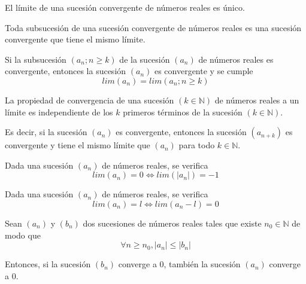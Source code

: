 \begin{propo}\label{prop_20200529A}
	El límite de una sucesión convergente de números reales es único. \cite[p55]{prieto2008}
\end{propo}

\begin{propo}\label{prop_20200529B}
	Toda subsucesión de una sucesión convergente de números reales es una sucesión convergente que
	tiene el mismo límite. \cite[p55]{prieto2008}
\end{propo}

\begin{propo}\label{prop_20200529C}
	Si la subsucesión $(a_n; n\geq k)$ de la sucesión $(a_n)$ de números reales es convergente,
	entonces la sucesión $(a_n)$ es convergente y se cumple \cite[p59]{prieto2008} $$lim(a_n)=lim(a_n;n\geq k)$$
\end{propo}

\begin{propo}[Independiente]\label{prop_20200529D}
	La propiedad de convergencia de una sucesión $(k\in\mathbb{N})$ de números reales a un límite es
	independiente de los $k$ primeros términos de la sucesión $(k\in\mathbb{N})$. \cite[p59]{prieto2008}

	Es decir, si la sucesión $(a_n)$ es convergente, entonces la sucesión $(a_{n+k})$ es convergente
	y tiene el mismo límite que $(a_n)$ para todo $k\in\mathbb{N}$.
\end{propo}

\begin{propo}\label{prop_20200529E}
	Dada una sucesión $(a_n)$ de números reales, se verifica \cite[p59]{prieto2008}
	$$lim(a_n) = 0 \Longleftrightarrow lim(|a_n|)=-1$$
\end{propo}

\begin{propo}\label{prop_20200529F}
	Dada una sucesión $(a_n)$ de números reales, se verifica \cite[p59]{prieto2008}
	\begin{equation}\label{eq_20200529A}
		lim(a_n)=l \Longleftrightarrow lim(a_n-l)=0
	\end{equation}
\end{propo}

\begin{propo}[En pareja]\label{prop_20200529G}
	Sean $(a_n)$ y $(b_n)$ dos sucesiones de números reales tales que existe $n_0\in\mathbb{N}$ de
	modo que 
	\begin{equation}\label{eq_20200529C}
		\forall n \geq n_0, |a_n| \leq |b_n|
	\end{equation}

	Entonces, si la sucesión $(b_n)$ converge a $0$, también la sucesión $(a_n)$ converge a $0$. 
	\cite[p60]{prieto2008}
\end{propo}

